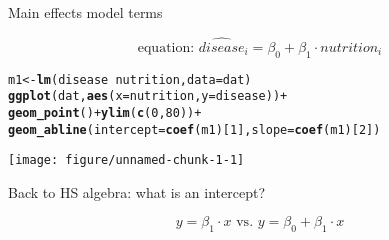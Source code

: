 \documentclass[table]{beamer}\usepackage[]{graphicx}\usepackage[]{color}
\makeatletter
\def\maxwidth{ %
  \ifdim\Gin@nat@width>\linewidth
    \linewidth
  \else
    \Gin@nat@width
  \fi
}
\newcommand{\hlnum}[1]{\textcolor[rgb]{0.686,0.059,0.569}{#1}}%
\newcommand{\hlopt}[1]{\textcolor[rgb]{0,0,0}{#1}}%
\newcommand{\hlstd}[1]{\textcolor[rgb]{0.345,0.345,0.345}{#1}}%
\newcommand{\hlkwb}[1]{\textcolor[rgb]{0.69,0.353,0.396}{#1}}%
\newcommand{\hlkwc}[1]{\textcolor[rgb]{0.333,0.667,0.333}{#1}}%
\newcommand{\hlkwd}[1]{\textcolor[rgb]{0.737,0.353,0.396}{\textbf{#1}}}%
\newenvironment{kframe}{%
 \def\at@end@of@kframe{}%
 \ifinner\ifhmode%
  \def\at@end@of@kframe{\end{minipage}}%
  \begin{minipage}{\columnwidth}%
 \fi\fi%
 \def\FrameCommand##1{\hskip\@totalleftmargin \hskip-\fboxsep
 \colorbox{shadecolor}{##1}\hskip-\fboxsep
     \hskip-\linewidth \hskip-\@totalleftmargin \hskip\columnwidth}%
 \MakeFramed {\advance\hsize-\width
   \@totalleftmargin\z@ \linewidth\hsize
   \@setminipage}}%
 {\par\unskip\endMakeFramed%
 \at@end@of@kframe}
\newenvironment{knitrout}{}{} %
\makeatother
\begin{document}

\begin{frame}[fragile]{Main effects model terms}

$$ \mbox{equation: \ }  \widehat{disease}_i = \beta_0 + \beta_1\cdot nutrition_i $$

\begin{knitrout}\scriptsize
{}\color{fgcolor}\begin{kframe}
\begin{alltt}
\hlstd{m1} \hlkwb{<-} \hlkwd{lm}\hlstd{(disease} \hlopt{~} \hlstd{nutrition,} \hlkwc{data}\hlstd{=dat)}
\hlkwd{ggplot}\hlstd{(dat,} \hlkwd{aes}\hlstd{(}\hlkwc{x}\hlstd{=nutrition,} \hlkwc{y}\hlstd{=disease))} \hlopt{+}
  \hlkwd{geom_point}\hlstd{()} \hlopt{+} \hlkwd{ylim}\hlstd{(}\hlkwd{c}\hlstd{(}\hlnum{0}\hlstd{,}\hlnum{80}\hlstd{))} \hlopt{+}
  \hlkwd{geom_abline}\hlstd{(}\hlkwc{intercept} \hlstd{=} \hlkwd{coef}\hlstd{(m1)[}\hlnum{1}\hlstd{],} \hlkwc{slope} \hlstd{=} \hlkwd{coef}\hlstd{(m1)[}\hlnum{2}\hlstd{])}
\end{alltt}
\end{kframe}
\texttt{[image: figure/unnamed-chunk-1-1]} 

\end{knitrout}

\end{frame}



\begin{frame}[fragile]{Back to HS algebra: what is an intercept?}

$$ y = \beta_1 \cdot x \mbox{\ \ \ \  vs. \ \ \ \ } y = \beta_0 + \beta_1 \cdot x $$

\vspace{12em}


\end{frame}

\end{document}
